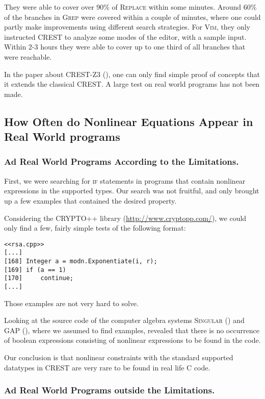 \documentclass[oribibl]{llncs}
\begin{document}
They were able to cover over 90\% of \textsc{Replace} within some
minutes. Around 60\% of the branches in \textsc{Grep} were covered
within a couple of minutes, where one could partly make improvements
using different search strategies. For \textsc{Vim}, they only instructed \textsc{CREST} to analyze some modes of the editor, with a
sample input. Within 2-3 hours they were able to cover up to one third
of all branches that were reachable.

In the paper about \textsc{CREST-Z3} (\cite{CRESTZ3}), one can only
find simple proof of concepts that it extends the classical
\textsc{CREST}. A large test on real world programs has not been made.

\subsection{How Often do Nonlinear Equations Appear in Real World
  programs}

\subsubsection{Ad Real World Programs According to the Limitations.}
First, we were searching for \textsc{if} statements in programs that
contain nonlinear expressions in the supported types. Our search was
not fruitful, and only brought up a few examples that contained the
desired property.

Considering the \textsc{CRYPTO++} library
(\url{http://www.cryptopp.com/}), we could only find a few, fairly
simple tests of the following format:

\begin{verbatim}
<<rsa.cpp>>
[...]
[168] Integer a = modn.Exponentiate(i, r);
[169] if (a == 1)
[170]     continue;
[...]
\end{verbatim}

Those examples are not very hard to solve.

Looking at the source code of the computer algebra systems \textsc{Singular} (\cite{Singular:2012})
and \textsc{GAP} (\cite{GAP4}), where we assumed to find examples,
revealed that there is no occurrence of boolean expressions consisting
of nonlinear expressions to be
found in the code.

Our conclusion is that nonlinear constraints with the standard
supported datatypes in \textsc{CREST} are very rare to be found in
real life \textsc{C} code.

\subsubsection{Ad Real World Programs outside the Limitations.}
\end{document}
